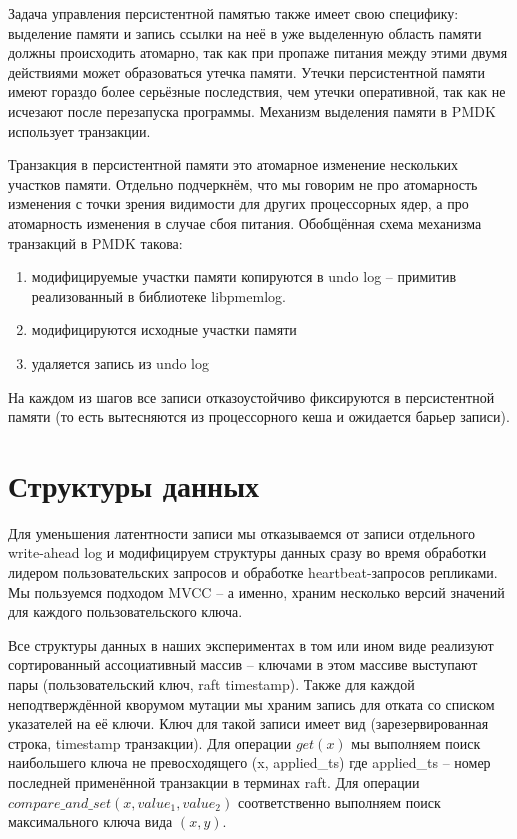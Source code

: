 \documentclass[pdftex,ptm,12pt,a4paper]{report}
\theoremstyle{definition}
\begin{document}
\label{allocations}
Задача управления персистентной памятью также имеет свою специфику: выделение памяти и запись ссылки на неё в уже выделенную область памяти должны происходить атомарно, так как
при пропаже питания между этими двумя действиями может образоваться утечка памяти. Утечки персистентной памяти имеют гораздо более серьёзные последствия, чем утечки оперативной,
так как не исчезают после перезапуска программы. Механизм выделения памяти в PMDK использует транзакции.

Транзакция в персистентной памяти это атомарное изменение нескольких участков памяти. Отдельно подчеркнём, что мы говорим не про атомарность изменения с точки зрения видимости
для других процессорных ядер, а
про атомарность изменения в случае сбоя питания.
Обобщённая схема механизма транзакций в PMDK такова:
\begin{enumerate}
    \item модифицируемые участки памяти копируются в undo log -- примитив реализованный в библиотеке libpmemlog.
    \item модифицируются исходные участки памяти
    \item удаляется запись из undo log
\end{enumerate}
На каждом из шагов все записи отказоустойчиво фиксируются в персистентной памяти (то есть вытесняются из процессорного кеша и ожидается барьер записи).

\section{Структуры данных}
\label{datastructures}
Для уменьшения латентности записи мы отказываемся от записи отдельного write-ahead log и модифицируем структуры данных сразу во время обработки лидером пользовательских запросов
и обработке heartbeat-запросов репликами. 
Мы пользуемся подходом MVCC \cite{bernstein1983multiversion} -- а именно, храним несколько версий значений для каждого пользовательского ключа.

Все структуры данных в наших экспериментах в том или ином виде реализуют сортированный ассоциативный массив -- ключами в этом массиве выступают пары (пользовательский ключ, raft timestamp).
Также для каждой неподтверждённой кворумом мутации мы храним запись для отката со списком указателей на её ключи. Ключ для такой записи имеет вид
(зарезервированная строка, timestamp транзакции).
Для операции $get(x)$ мы выполняем поиск наибольшего ключа не превосходящего (x, applied\_ts) где applied\_ts -- номер последней применённой транзакции в терминах raft.
Для операции $compare\_and\_set(x, value_1, value_2)$ соответственно выполняем поиск максимального ключа вида $(x, y).$
\end{document}
